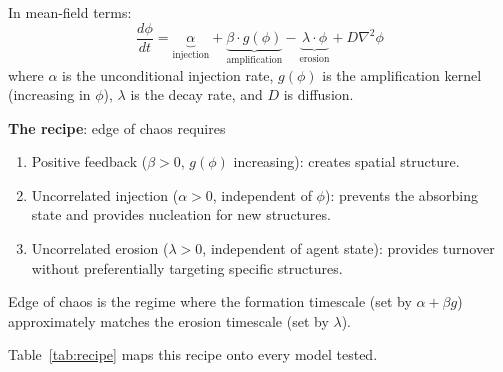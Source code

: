 \documentclass[11pt,a4paper]{article}
\begin{document}
In mean-field terms:
\begin{equation}
  \frac{d\phi}{dt} = \underbrace{\alpha}_{\text{injection}} + \underbrace{\beta \cdot g(\phi)}_{\text{amplification}} - \underbrace{\lambda \cdot \phi}_{\text{erosion}} + D\nabla^2\phi
  \label{eq:recipe}
\end{equation}
where $\alpha$ is the unconditional injection rate, $g(\phi)$ is the amplification kernel (increasing in $\phi$), $\lambda$ is the decay rate, and $D$ is diffusion.

\textbf{The recipe}: edge of chaos requires
\begin{enumerate}
  \item[(R1)] Positive feedback ($\beta > 0$, $g(\phi)$ increasing): creates spatial structure.
  \item[(R2)] Uncorrelated injection ($\alpha > 0$, independent of $\phi$): prevents the absorbing state and provides nucleation for new structures.
  \item[(R3)] Uncorrelated erosion ($\lambda > 0$, independent of agent state): provides turnover without preferentially targeting specific structures.
\end{enumerate}
Edge of chaos is the regime where the formation timescale (set by $\alpha + \beta g$) approximately matches the erosion timescale (set by $\lambda$).

Table~\ref{tab:recipe} maps this recipe onto every model tested.
\end{document}
